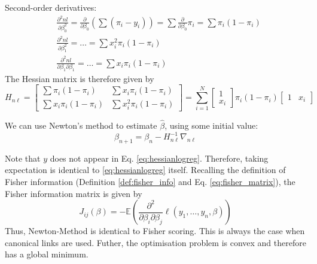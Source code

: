 \documentclass[11pt, %
	oneside, %
	english, %
	onehalfspacing, %
	]{article} %
\numberwithin{equation}{section}
\begin{document}
Second-order derivatives:
\begin{equation*}
    \begin{aligned}
        & \frac{\partial^2 n l}{\partial \beta_0^2}=\frac{\partial}{\partial \beta_0}\left(\sum\left(\pi_i-y_i\right)\right)=\sum \frac{\partial}{\partial \beta_0} \pi_i=\sum \pi_i\left(1-\pi_i\right) \\
        & \frac{\partial^2 n l}{\partial \beta_1^2}=\ldots=\sum x_i^2 \pi_i\left(1-\pi_i\right) \\
        & \frac{\partial^2 n l}{\partial \beta_1 \partial \beta_1}=\ldots=\sum x_i \pi_i\left(1-\pi_i\right)
    \end{aligned}
\end{equation*}
The Hessian matrix is therefore given by
\begin{equation}\label{eq:hessianlogreg}
    H_{n \ell }=
    \begin{bmatrix}
        \sum \pi_i\left(1-\pi_i\right) & \sum x_i \pi_i\left(1-\pi_i\right) \\
        \sum x_i \pi_i\left(1-\pi_i\right) & \sum x_i^2 \pi_i\left(1-\pi_i\right)
    \end{bmatrix}
     =
     \sum_{i=1}^{N}
     \begin{bmatrix}
        1 \\
        x_i
     \end{bmatrix}
     \pi_i\left(1-\pi_i\right)
     \begin{bmatrix}
        1 & x_i
     \end{bmatrix}
\end{equation}

We can use Newton's method to estimate $\hat{\beta}$, using some initial value:
\begin{equation*}
    \beta_{n+1}=\beta_n-H_{n \ell}^{-1} \nabla_{n \ell}
\end{equation*}

Note that $y$ does not appear in Eq. \eqref{eq:hessianlogreg}. Therefore, taking expectation is identical to \eqref{eq:hessianlogreg} itself. Recalling the definition of Fisher information (Definition \ref{def:fisher_info} and Eq. \eqref{eq:fisher_matrix}), the Fisher information matrix is given by
\begin{equation*}
    J_{i j}(\beta)=-\mathbb{E}\left(\frac{\partial^2}{\partial \beta_i \partial \beta_j} \ell \left(y_1, \ldots, y_n, \beta\right)\right)
\end{equation*}
Thus, Newton-Method is identical to Fisher scoring. This is always the case when canonical links are used. Futher, the optimisation problem is convex and therefore has a global minimum.
\end{document}
